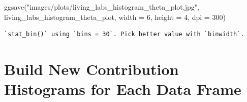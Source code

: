 \documentclass[
  letterpaper,
]{report}
\newenvironment{Shaded}{\begin{snugshade}}{\end{snugshade}}
\newcommand{\AttributeTok}[1]{\textcolor[rgb]{0.40,0.45,0.13}{#1}}
\newcommand{\DecValTok}[1]{\textcolor[rgb]{0.68,0.00,0.00}{#1}}
\newcommand{\FunctionTok}[1]{\textcolor[rgb]{0.28,0.35,0.67}{#1}}
\newcommand{\NormalTok}[1]{\textcolor[rgb]{0.00,0.23,0.31}{#1}}
\newcommand{\StringTok}[1]{\textcolor[rgb]{0.13,0.47,0.30}{#1}}
\begin{document}
\begin{Shaded}
\begin{Highlighting}[]
\FunctionTok{ggsave}\NormalTok{(}\StringTok{"images/plots/living\_labs\_histogram\_theta\_plot.jpg"}\NormalTok{, living\_labs\_histogram\_theta\_plot, }\AttributeTok{width =} \DecValTok{6}\NormalTok{, }\AttributeTok{height =} \DecValTok{4}\NormalTok{, }\AttributeTok{dpi =} \DecValTok{300}\NormalTok{)}
\end{Highlighting}
\end{Shaded}

\begin{verbatim}
`stat_bin()` using `bins = 30`. Pick better value with `binwidth`.
\end{verbatim}

\hypertarget{build-new-contribution-histograms-for-each-data-frame}{%
\section{Build New Contribution Histograms for Each Data
Frame}\label{build-new-contribution-histograms-for-each-data-frame}}
\end{document}
